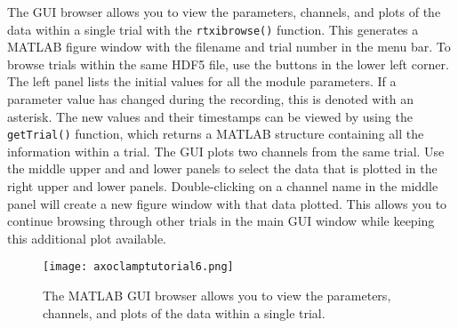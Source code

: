 The GUI browser allows you to view the parameters, channels, and plots of the data within a single trial with the \texttt{rtxibrowse()} function. This generates a MATLAB figure window with the filename and trial number in the menu bar. To browse trials within the same HDF5 file, use the buttons in the lower left corner. The left panel lists the initial values for all the module parameters. If a parameter value has changed during the recording, this is denoted with an asterisk. The new values and their timestamps can be viewed by using the \texttt{getTrial()} function, which returns a MATLAB structure containing all the information within a trial. The GUI plots two channels from the same trial. Use the middle upper and and lower panels to select the data that is plotted in the right upper and lower panels. Double-clicking on a channel name in the middle panel will create a new figure window with that data plotted. This allows you to continue browsing through other trials in the main GUI window while keeping this additional plot available.

\begin{figure}[h!]
\begin{maxipage}
\begin{center}
\texttt{[image: axoclamptutorial6.png]} 
\caption[RTXI HDF5 MATLAB GUI]{The MATLAB GUI browser allows you to view the parameters, channels, and plots of the data within a single trial.} 
\label{fig:HDF5 MATLAB}
\end{center}
\end{maxipage}
\end{figure}
